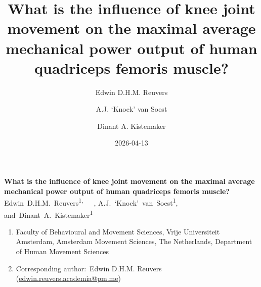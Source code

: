 \documentclass[
  11pt,
  a4paper]{article}
\title{What is the influence of knee joint movement on the maximal
average mechanical power output of human quadriceps femoris muscle?}
\author{Edwin D.H.M. Reuvers \and A.J. `Knoek' van Soest \and Dinant A.
Kistemaker}
\date{2026-04-13}
\begin{document}
\begin{titlepage}
\begin{titlepage}

\raggedright
{\sffamily\LARGE\bfseries\nohyphens{What is the influence of knee joint
movement on the maximal average mechanical power output of human
quadriceps femoris muscle?}}\\[2\baselineskip]


	    \mbox{\normalsize{Edwin D.H.M.
Reuvers}\textsuperscript{1}\textsuperscript{,}{\textsuperscript{ \Letter}} ,}
	    \mbox{\normalsize{A.J. `Knoek' van Soest}\textsuperscript{1},}
				\mbox{and \normalsize{Dinant A.
Kistemaker}\textsuperscript{1} }
	
\vspace{0.5\baselineskip}

  \begin{enumerate}[label={~\arabic*}, leftmargin=*, align=left, labelsep=0em, nosep]
  
                  \item[\small\textsuperscript{1}]
        \small{Faculty of Behavioural and Movement Sciences, Vrije
Universiteit Amsterdam, Amsterdam Movement Sciences, The Netherlands,}
        \small{Department of Human Movement Sciences}
            
  \vspace{0.5\baselineskip}
  
            \item[\small\textsuperscript{\Letter}]
      \small{Corresponding author:~Edwin D.H.M.
Reuvers (\href{mailto:edwin.reuvers.academia@pm.me}{edwin.reuvers.academia@pm.me})}
                    \end{enumerate}


\end{titlepage}
\end{titlepage}
\end{document}
